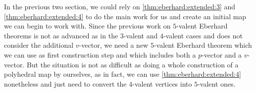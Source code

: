 \label{sec:3:5}

In the previous two section, we could rely on \autoref{thm:eberhard:extended:3} and \autoref{thm:eberhard:extended:4} to do the main work for us and create an initial map we can begin to work with. Since the previous work on $5$-valent {\sc Eberhard} theorems is not as advanced as in the $3$-valent and $4$-valent cases and does not consider the additional $v$-vector, we need a new $5$-valent {\sc Eberhard} theorem which we can use as first construction step and which includes both a $p$-vector and a $v$-vector. But the situation is not as difficult as doing a whole construction of a polyhedral map by ourselves, as in fact, we can use \autoref{thm:eberhard:extended:4} nonetheless and just need to convert the $4$-valent vertices into $5$-valent ones.
\clearpage
